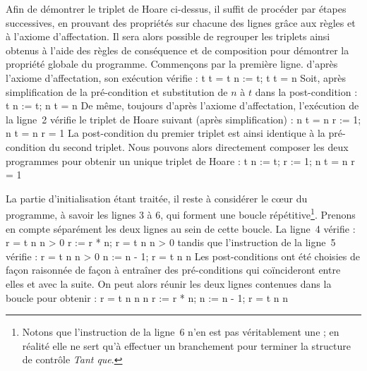 

Afin de démontrer le triplet de Hoare ci-dessus, il suffit de procéder par étapes successives, en prouvant des propriétés sur chacune des lignes grâce aux règles et à l'axiome d'affectation. Il sera alors possible de regrouper les triplets ainsi obtenus à l'aide des règles de conséquence et de composition pour démontrer la propriété globale du programme.
Commençons par la première ligne. d'après l'axiome d'affectation, son exécution vérifie :
  \hbegin t  \wedge t = t \ha n := t; \hb t  \wedge t = n \hend
Soit, après simplification de la pré-condition et substitution de $n$ à $t$ dans la post-condition :
  \hbegin t  \ha n := t; \hb n  \wedge t = n \hend
De même, toujours d'après l'axiome d'affectation, l'exécution de la ligne~2 vérifie le triplet de Hoare suivant (après simplification) :
  \hbegin n  \wedge t = n \ha r := 1; \hb n  \wedge t = n \wedge r = 1 \hend
La post-condition du premier triplet est ainsi identique à la pré-condition du second triplet. Nous pouvons alors directement composer les deux programmes pour obtenir un unique triplet de Hoare :
  \hbegin t  \ha n := t; r := 1; \hb n  \wedge t = n \wedge r = 1 \hend \doublespacing

\singlespacing La partie d'initialisation étant traitée, il reste à considérer le c\oe ur du programme, à savoir les lignes 3 à 6, qui forment une boucle répétitive\footnote{Notons que l'instruction de la ligne~6 n'en est pas véritablement une ; en réalité elle ne sert qu'à effectuer un branchement pour terminer la structure de contrôle \textit{Tant que}.}. Prenons en compte séparément les deux lignes au sein de cette boucle. La ligne~4 vérifie :
  \hbegin r =  \wedge t \geq n \wedge n > 0 \ha r := r * n; \hb r =  \wedge t \geq n \wedge n > 0 \hend
tandis que l'instruction de la ligne~5 vérifie :
  \hbegin r =  \wedge t \geq n \wedge n > 0 \ha n := n - 1; \hb r =  \wedge t \geq n \wedge n  \hend
Les post-conditions ont été choisies de façon \og raisonnée \fg{} de façon à entraîner des pré-conditions qui coïncideront entre elles et avec la suite. On peut alors réunir les deux lignes contenues dans la boucle pour obtenir :
  \hbegin r =  \wedge t \geq n \wedge n  \wedge n  \ha r := r * n; n := n - 1; \hb r =  \wedge t \geq n \wedge n  \hend \doublespacing

